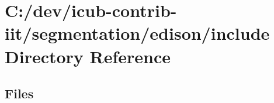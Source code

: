 \section{C\+:/dev/icub-\/contrib-\/iit/segmentation/edison/include Directory Reference}
\label{dir_23c3d01ad0b91215423e8a88542d5e2b}
\subsection*{Files}
\begin{DoxyCompactItemize}
\end{DoxyCompactItemize}
